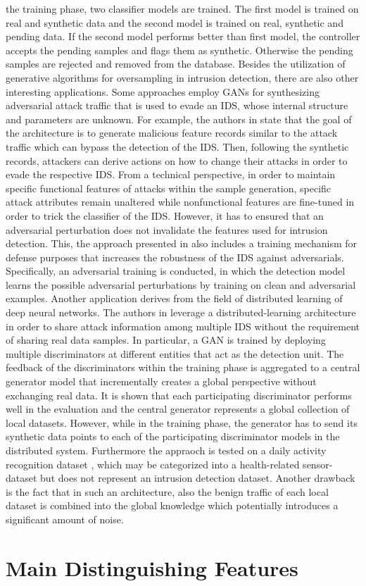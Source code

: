 \documentclass[../../main.tex]{subfiles}
\begin{document}
the training phase, two classifier models are trained. The first model is trained on real and synthetic data and the second model is trained on real, synthetic and pending data. If the second model performs better than first model, the controller accepts the pending samples and flags them as synthetic. Otherwise the pending samples are rejected and removed from the database. Besides the utilization of generative algorithms for oversampling in intrusion detection, there are also other interesting applications. Some approaches employ GANs for synthesizing adversarial attack traffic that is used to evade an IDS, whose internal structure and parameters are unknown. For example, the authors in \cite{lin2022idsgan} state that the goal of the architecture is to generate malicious feature records similar to the attack traffic which can bypass the detection of the IDS. Then, following the synthetic records, attackers can derive actions on how to change their attacks in order to evade the respective IDS. From a technical perspective, in order to maintain specific functional features of attacks within the sample generation, specific attack attributes remain unaltered while nonfunctional features are fine-tuned in order to trick the classifier of the IDS. However, it has to ensured that an adversarial perturbation does not invalidate the features used for intrusion detection. This, the approach presented in \cite{usama2019generative} also includes a training mechanism for defense purposes that increases the robustness of the IDS against adversarials. Specifically, an adversarial training \cite{szegedy2013intriguing} is conducted, in which the detection model learns the possible adversarial perturbations by training on clean and adversarial examples. Another application derives from the field of distributed learning of deep neural networks. The authors in \cite{ferdowsi2019generative} leverage a distributed-learning architecture in order to share attack information among multiple IDS without the requirement of sharing real data samples. In particular, a GAN is trained by deploying multiple discriminators at different entities that act as the detection unit. The feedback of the discriminators within the training phase is aggregated to a central generator model that incrementally creates a global perspective without exchanging real data. It is shown that each participating discriminator performs well in the evaluation and the central generator represents a global collection of local datasets. However, while in the training phase, the generator has to send its synthetic data points to each of the participating discriminator models in the distributed system. Furthermore the appraoch is tested on a daily activity recognition dataset \cite{reyes2016transition}, which may be categorized into a health-related sensor-dataset but does not represent an intrusion detection dataset. Another drawback is the fact that in such an architecture, also the benign traffic of each local dataset is combined into the global knowledge which potentially introduces a significant amount of noise. 

\section{Main Distinguishing Features}
\end{document}

